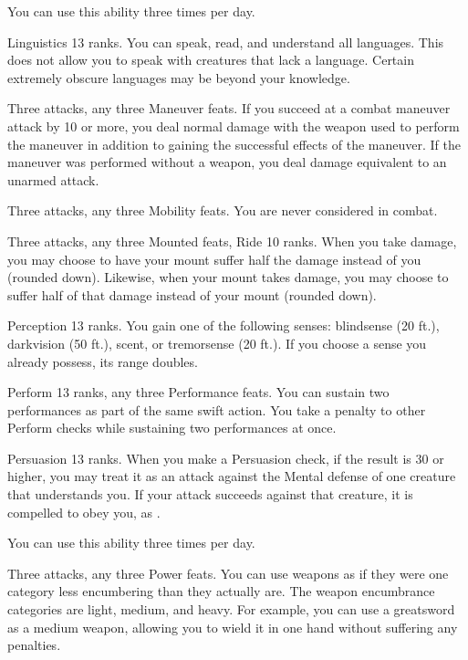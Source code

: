 You can use this ability three times per day.

\featpre Linguistics 13 ranks.
\featben You can speak, read, and understand all languages.
This does not allow you to speak with creatures that lack a language.
Certain extremely obscure languages may be beyond your knowledge.

\featpres Three attacks, any three Maneuver feats.
\featben If you succeed at a combat maneuver attack by 10 or more, you deal normal damage with the weapon used to perform the maneuver in addition to gaining the successful effects of the maneuver.
If the maneuver was performed without a weapon, you deal damage equivalent to an unarmed attack.

\featpres Three attacks, any three Mobility feats.
\featben You are never considered \engaged in combat.

\featpres Three attacks, any three Mounted feats, Ride 10 ranks.
\featben When you take damage, you may choose to have your mount suffer half the damage instead of you (rounded down).
Likewise, when your mount takes damage, you may choose to suffer half of that damage instead of your mount (rounded down).

\featpre Perception 13 ranks.
\featben You gain one of the following senses: blindsense (20 ft.), darkvision (50 ft.), scent, or tremorsense (20 ft.).
If you choose a sense you already possess, its range doubles.

\featpres Perform 13 ranks, any three Performance feats.
\featben You can sustain two performances as part of the same swift action.
You take a  penalty to other Perform checks while sustaining two performances at once.

\featpre Persuasion 13 ranks.
\featben When you make a Persuasion check, if the result is 30 or higher, you may treat it as an attack against the Mental defense of one creature that understands you.
If your attack succeeds against that creature, it is compelled to obey you, as .

You can use this ability three times per day.

\featpres Three attacks, any three Power feats.
\featben You can use weapons as if they were one category less encumbering than they actually are.
The weapon encumbrance categories are light, medium, and heavy.
For example, you can use a greatsword as a medium weapon, allowing you to wield it in one hand without suffering any penalties.

